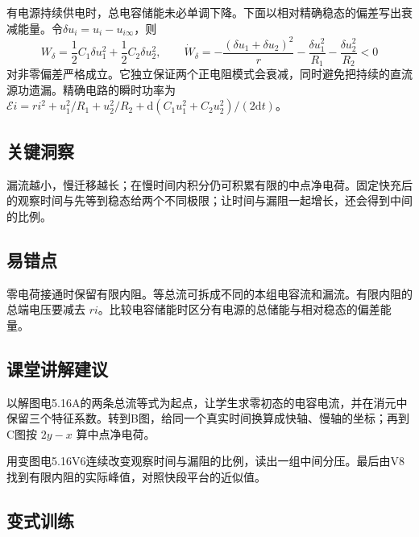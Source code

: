 \documentclass[UTF8,fontset=fandol,a4paper,11pt]{ctexart}
\begin{document}
有电源持续供电时，总电容储能未必单调下降。下面以相对精确稳态的偏差写出衰减能量。令$\delta u_i=u_i-u_{i\infty}$，则
\[
W_\delta=\frac12C_1\delta u_1^2+\frac12C_2\delta u_2^2,\qquad
\dot W_\delta=-\frac{(\delta u_1+\delta u_2)^2}{r}
-\frac{\delta u_1^2}{R_1}-\frac{\delta u_2^2}{R_2}<0
\]
对非零偏差严格成立。它独立保证两个正电阻模式会衰减，同时避免把持续的直流源功遗漏。精确电路的瞬时功率为$\mathcal E i=ri^2+u_1^2/R_1+u_2^2/R_2+\mathrm d(C_1u_1^2+C_2u_2^2)/(2\mathrm dt)$。




\subsection*{关键洞察}

漏流越小，慢迁移越长；在慢时间内积分仍可积累有限的中点净电荷。固定快充后的观察时间与先等到稳态给两个不同极限；让时间与漏阻一起增长，还会得到中间的比例。



\subsection*{易错点}

零电荷接通时保留有限内阻。等总流可拆成不同的本组电容流和漏流。有限内阻的总端电压要减去 $ri$。比较电容储能时区分有电源的总储能与相对稳态的偏差能量。



\subsection*{课堂讲解建议}

以解图电5.16A的两条总流等式为起点，让学生求零初态的电容电流，并在消元中保留三个特征系数。转到B图，给同一个真实时间换算成快轴、慢轴的坐标；再到C图按 $2y-x$ 算中点净电荷。

用变图电5.16V6连续改变观察时间与漏阻的比例，读出一组中间分压。最后由V8找到有限内阻的实际峰值，对照快段平台的近似值。


\subsection*{变式训练}
\end{document}

